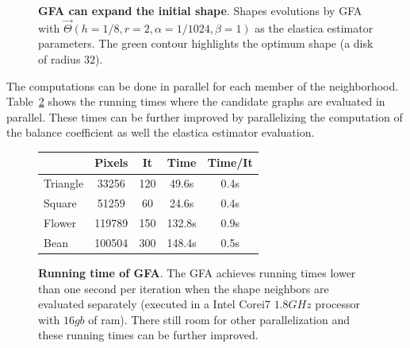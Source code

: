 \documentclass[smallextended]{svjour3}
\begin{document}
\begin{figure}
\caption{\textbf{GFA can expand the initial shape}. Shapes evolutions by GFA with $\vec{\Theta}(h=1/8,r=2,\alpha=1/1024, \beta=1)$ as the elastica estimator parameters. The green contour highlights the optimum shape (a disk of radius $32$).}
\label{fig:graph-flow-expand}
\end{figure}
%
%
The computations can be done in parallel for each member of the neighborhood. Table~\ref{tab:summary-graph-flow-running-time} shows the running times where the candidate graphs are evaluated in parallel. These times can be further improved by parallelizing the computation of the balance coefficient as well the elastica estimator evaluation.
%
%
\begin{figure}[h!]
\center
\captionsetup{type=table}
\footnotesize
\begin{tabular}{|l|c|c|c|c|}
\hline
& Pixels & It & Time & Time/It\\
\hline
Triangle & 33256 & 120 & 49.6s & 0.4s \\
Square & 51259 & 60 & 24.6s & 0.4s \\
Flower & 119789 & 150 & 132.8s & 0.9s \\
Bean & 100504 & 300 & 148.4s & 0.5s \\
\hline
\end{tabular}
\caption{\textbf{Running time of GFA}. The GFA achieves running times lower than one second per iteration when the shape neighbors are evaluated separately (executed in a Intel Corei7 $1.8GHz$ processor with $16gb$ of ram). There still room for other parallelization and these running times can be further improved.}
\label{tab:summary-graph-flow-running-time} 
\end{figure}
%
%
\end{document}
